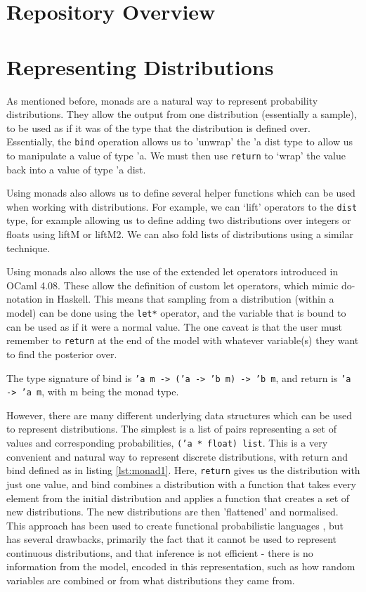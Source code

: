\section{Repository Overview}

\section{Representing Distributions}

As mentioned before, monads are a natural way to represent probability distributions. They allow the output from one distribution (essentially a sample), to be used as if it was of the type that the distribution is defined over. Essentially, the \texttt{bind} operation allows us to 'unwrap' the 'a dist type to allow us to manipulate a value of type 'a. We must then use \texttt{return} to `wrap' the value back into a value of type 'a dist.

Using monads also allows us to define several helper functions which can be used when working with distributions. For example, we can `lift' operators to the \texttt{dist} type, for example allowing us to define adding two distributions over integers or floats using liftM or liftM2. We can also fold lists of distributions using a similar technique.

Using monads also allows the use of the extended let operators introduced in OCaml 4.08. These allow the definition of custom let operators, which mimic do-notation in Haskell. This means that sampling from a distribution (within a model) can be done using the \texttt{let*} operator, and the variable that is bound to can be used as if it were a normal value. The one caveat is that the user must remember to \texttt{return} at the end of the model with whatever variable(s) they want to find the posterior over.

The type signature of bind is \texttt{'a m -> ('a -> 'b m) -> 'b m}, and return is \texttt{'a -> 'a m}, with m being the monad type.


However, there are many different underlying data structures which can be used to represent distributions. The simplest is a list of pairs representing a set of values and corresponding probabilities, \texttt{('a * float) list}. This is a very convenient and natural way to represent discrete distributions, with return and bind defined as in listing \ref{lst:monad1}. Here, \texttt{return} gives us the distribution with just one value, and bind combines a distribution with a function that takes every element from the initial distribution and applies a function that creates a set of new distributions. The new distributions are then 'flattened' and normalised. This approach has been used to create functional probabilistic languages \cite{erwig}, but has several drawbacks, primarily the fact that it cannot be used to represent continuous distributions, and that inference is not efficient - there is no information from the model, encoded in this representation, such as how random variables are combined or from what distributions they came from.

